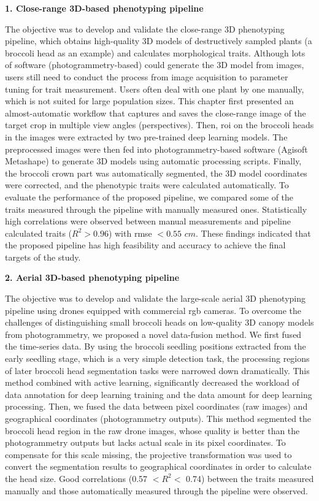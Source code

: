 \begin{doublespace}
\noindent
\textbf{1. Close-range 3D-based phenotyping pipeline}

The objective was to develop and validate the close-range 3D phenotyping pipeline, which obtains high-quality 3D models of destructively sampled plants (a broccoli head as an example) and calculates morphological traits. Although lots of software (photogrammetry-based) could generate the 3D model from images, users still need to conduct the process from image acquisition to parameter tuning for trait measurement. Users often deal with one plant by one manually, which is not suited for large population sizes. This chapter first presented an almost-automatic workflow that captures and saves the close-range image of the target crop in multiple view angles (perspectives). Then, \gls{roi} on the broccoli heads in the images were extracted by two pre-trained deep learning models. The preprocessed images were then fed into photogrammetry-based software (Agisoft Metashape) to generate 3D models using automatic processing scripts. Finally, the broccoli crown part was automatically segmented, the 3D model coordinates were corrected, and the phenotypic traits were calculated automatically. To evaluate the performance of the proposed pipeline, we compared some of the traits measured through the pipeline with manually measured ones. Statistically high correlations were observed between manual measurements and pipeline calculated traits ($R^2>0.96$) with \gls{rmse} $< 0.55$ $cm$. These findings indicated that the proposed pipeline has high feasibility and accuracy to achieve the final targets of the study.

\vspace{5mm}
\noindent
\textbf{2. Aerial 3D-based phenotyping pipeline}

The objective was to develop and validate the large-scale aerial 3D phenotyping pipeline using drones equipped with commercial \gls{rgb} cameras. To overcome the challenges of distinguishing small broccoli heads on low-quality 3D canopy models from photogrammetry, we proposed a novel data-fusion method. We first fused the time-series data. By using the broccoli seedling positions extracted from the early seedling stage, which is a very simple detection task, the processing regions of later broccoli head segmentation tasks were narrowed down dramatically. This method combined with active learning, significantly decreased the workload of data annotation for deep learning training and the data amount for deep learning processing. Then, we fused the data between pixel coordinates (raw images) and geographical coordinates (photogrammetry outputs). This method segmented the broccoli head region in the raw drone images, whose quality is better than the photogrammetry outputs but lacks actual scale in its pixel coordinates. To compensate for this scale missing, the projective transformation was used to convert the segmentation results to geographical coordinates in order to calculate the head size. Good correlations (0.57 $<R^2<$ 0.74) between the traits measured manually and those automatically measured through the pipeline were observed.


\end{doublespace}

